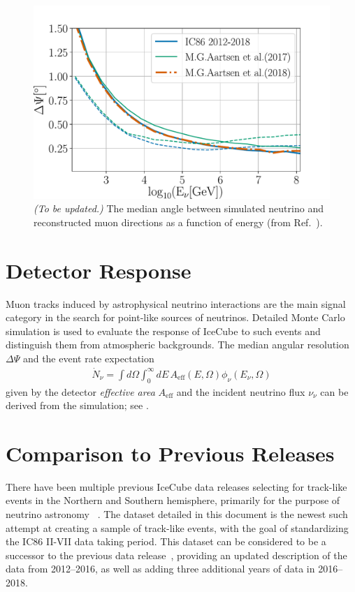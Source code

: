 \documentclass[aps,10pt,prd,twocolumn,floats,letterpaper,showpacs,nofootinbib,bibnotes,notitlepage,superscriptaddress,floatfix]{revtex4-1}
\newcommand{\MA}[1]{{\color{magenta}#1}}
\begin{document}
\begin{figure}[t]
\centering
\includegraphics[width=\linewidth]{IC86II_PSF.pdf}
\caption[]{\MA{\it (To be updated.)} The median angle between simulated neutrino and reconstructed muon directions as a function of energy (from Ref.~\cite{Aartsen:2019fau}).}\label{fig:PSF}
\end{figure}

\section{Detector Response}

Muon tracks induced by astrophysical neutrino interactions are the main signal category in the search for point-like sources of neutrinos. Detailed Monte Carlo simulation is used to evaluate the response of IceCube to such events and distinguish them from atmospheric backgrounds. The median angular resolution $\Delta\Psi$ and the event rate expectation
\begin{align}\label{eq:ev_rate}
\dot{N}_\nu=\int d\Omega\int_0^\infty dE\,A_\mathrm{eff}\left(E, \Omega\right) \phi_\nu\left(E_\nu,\Omega\right)
\end{align}
given by the detector \emph{effective area} $A_\mathrm{eff}$ and the incident neutrino flux $\nu_\nu$ can be derived from the simulation; see \cite{Aartsen:2016xlq}.

\section{Comparison to Previous Releases}

There have been multiple previous IceCube data releases selecting for track-like events in the Northern and Southern hemisphere, primarily for the purpose of neutrino astronomy ~\cite{Abbasi:2010rd,Aartsen:2013uuv,IceCube:2018,IceCube:2019,IceCube:TXS2018}. The dataset detailed in this document is the newest such attempt at creating a sample of track-like events, with the goal of standardizing the IC86 II-VII data taking period. This dataset can be considered to be a successor to the previous data release~\cite{IceCube:2019}, providing an updated description of the data from 2012--2016, as well as adding three additional years of data in 2016--2018. 
\end{document}
